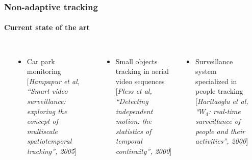 \begin{frame}
	\frametitle{Non-adaptive tracking}
	\framesubtitle{Current state of the art}
	
	\vspace{-3.0cm}
	
	\begin{columns}[t]
		
		{
			\vspace{0.22cm}
		}
		
		{
			\begin{itemize}
				\item Car park monitoring
				\vspace{0.1cm}
				\newline
				\tiny[\emph{Hampapur et al, ``Smart video surveillance: exploring the concept of multiscale spatiotemporal tracking'', 2005}]
			\end{itemize} 
		}
		
		{
			\vspace{0.41cm}
		}
		
		{
			\begin{itemize}
				\item Small objects tracking in aerial video sequences
				\vspace{-0.14cm}
				\newline
				\tiny[\emph{Pless et al, ``Detecting independent motion: the statistics of temporal continuity'', 2000}]
			\end{itemize}
			
			\vspace{0.13cm}
			
			\begin{itemize}
				\item Surveillance system specialized in people tracking
				\vspace{0.1cm}
				\newline
				\tiny[\emph{Haritaoglu et al, ``$ W_4 $: real-time surveillance of people and their activities'', 2000}]
			\end{itemize}
		}
		
		{
			\vspace{-3.18cm}
		}
		
		
		{
		}
		

\end{columns}
\end{frame}
